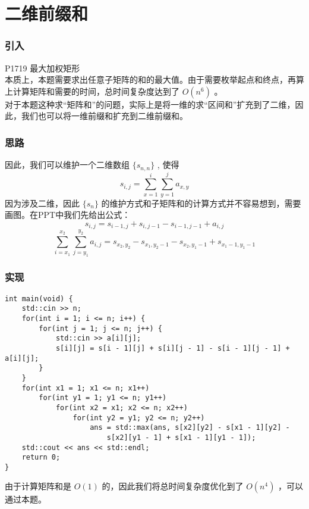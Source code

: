 \documentclass{beamer}
\begin{document}
\section{二维前缀和}
\begin{frame}
\frametitle{引入}
P1719 最大加权矩形 \\ 
本质上，本题需要求出任意子矩阵的和的最大值。由于需要枚举起点和终点，再算上计算矩阵和需要的时间，总时间复杂度达到了 $O(n^6)$ 。\\ 
对于本题这种求“矩阵和”的问题，实际上是将一维的求“区间和”扩充到了二维，因此，我们也可以将一维前缀和扩充到二维前缀和。
\end{frame}
\begin{frame}
\frametitle{思路}
因此，我们可以维护一个二维数组 $\{s_{n, n}\}$ , 使得
$$s_{i, j} = \sum_{x = 1}^{i}\sum_{y = 1}^{j}a_{x, y}$$ 
因为涉及二维，因此 $\{s_n\}$ 的维护方式和子矩阵和的计算方式并不容易想到，需要画图。在PPT中我们先给出公式：
$$s_{i, j} = s_{i - 1, j} + s_{i, j - 1} - s_{i - 1, j - 1} + a_{i, j}$$
$$\sum_{i = x_1}^{x_2}\sum_{j = y_1}^{y_2}a_{i, j} = s_{x_2, y_2} - s_{x_1, y_2 - 1} - s_{x_2, y_1 - 1} + s_{x_1 - 1, y_1 - 1}$$
\end{frame}
\begin{frame}[fragile]
\frametitle{实现}
\begin{onlyenv}
\begin{verbatim}
int main(void) {
    std::cin >> n;
    for(int i = 1; i <= n; i++) {
        for(int j = 1; j <= n; j++) {
            std::cin >> a[i][j];
            s[i][j] = s[i - 1][j] + s[i][j - 1] - s[i - 1][j - 1] + a[i][j];
        }
    }
    for(int x1 = 1; x1 <= n; x1++)
        for(int y1 = 1; y1 <= n; y1++)
            for(int x2 = x1; x2 <= n; x2++)
                for(int y2 = y1; y2 <= n; y2++)
                    ans = std::max(ans, s[x2][y2] - s[x1 - 1][y2] - 
                        s[x2][y1 - 1] + s[x1 - 1][y1 - 1]);
    std::cout << ans << std::endl;
    return 0;
}
\end{verbatim}
\end{onlyenv}
由于计算矩阵和是 $O(1)$ 的，因此我们将总时间复杂度优化到了 $O(n^4)$ ，可以通过本题。
\end{frame}
\end{document}
